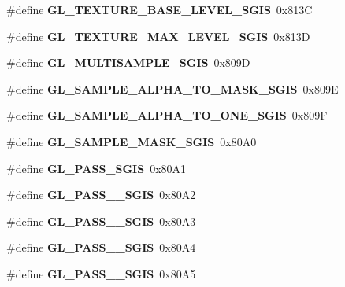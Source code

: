 \begin{DoxyCompactItemize}
\item 
\#define {\bfseries G\+L\+\_\+\+T\+E\+X\+T\+U\+R\+E\+\_\+\+B\+A\+S\+E\+\_\+\+L\+E\+V\+E\+L\+\_\+\+S\+G\+I\+S}~0x813\+C\label{_s_d_l__opengl_8h_a6cffbec20f615220cfe3c4c9a6023d9a}

\item 
\#define {\bfseries G\+L\+\_\+\+T\+E\+X\+T\+U\+R\+E\+\_\+\+M\+A\+X\+\_\+\+L\+E\+V\+E\+L\+\_\+\+S\+G\+I\+S}~0x813\+D\label{_s_d_l__opengl_8h_a08339bdcecc6c765c95c55df207abdf7}

\item 
\#define {\bfseries G\+L\+\_\+\+M\+U\+L\+T\+I\+S\+A\+M\+P\+L\+E\+\_\+\+S\+G\+I\+S}~0x809\+D\label{_s_d_l__opengl_8h_ab2bb2d97155be82a9efdd77243085da3}

\item 
\#define {\bfseries G\+L\+\_\+\+S\+A\+M\+P\+L\+E\+\_\+\+A\+L\+P\+H\+A\+\_\+\+T\+O\+\_\+\+M\+A\+S\+K\+\_\+\+S\+G\+I\+S}~0x809\+E\label{_s_d_l__opengl_8h_ab25a91683761a9d063c3298f41133b31}

\item 
\#define {\bfseries G\+L\+\_\+\+S\+A\+M\+P\+L\+E\+\_\+\+A\+L\+P\+H\+A\+\_\+\+T\+O\+\_\+\+O\+N\+E\+\_\+\+S\+G\+I\+S}~0x809\+F\label{_s_d_l__opengl_8h_a3ef686c0fa05a6337b1cacd916443870}

\item 
\#define {\bfseries G\+L\+\_\+\+S\+A\+M\+P\+L\+E\+\_\+\+M\+A\+S\+K\+\_\+\+S\+G\+I\+S}~0x80\+A0\label{_s_d_l__opengl_8h_a259d99ff0e18c7811cc01b98e9c51a37}

\item 
\#define {\bfseries G\+L\+\_\+P\+A\+S\+S\+\_\+\+S\+G\+I\+S}~0x80\+A1\label{_s_d_l__opengl_8h_a49502a48b1761c54e7712b2a7624e9b2}

\item 
\#define {\bfseries G\+L\+\_\+P\+A\+S\+S\+\_\+\_\+\+S\+G\+I\+S}~0x80\+A2\label{_s_d_l__opengl_8h_a6f88f24f5aabf5739c9ae604c1729d68}

\item 
\#define {\bfseries G\+L\+\_\+P\+A\+S\+S\+\_\+\_\+\+S\+G\+I\+S}~0x80\+A3\label{_s_d_l__opengl_8h_ab7e995d0e4115249466e4661750ab7d4}

\item 
\#define {\bfseries G\+L\+\_\+P\+A\+S\+S\+\_\+\_\+\+S\+G\+I\+S}~0x80\+A4\label{_s_d_l__opengl_8h_ac494352ec0e96ac67fdfe9d8189ff96b}

\item 
\#define {\bfseries G\+L\+\_\+P\+A\+S\+S\+\_\+\_\+\+S\+G\+I\+S}~0x80\+A5\label{_s_d_l__opengl_8h_aebac9095c5a86980ebc8665fda7d68d2}


\end{DoxyCompactItemize}
